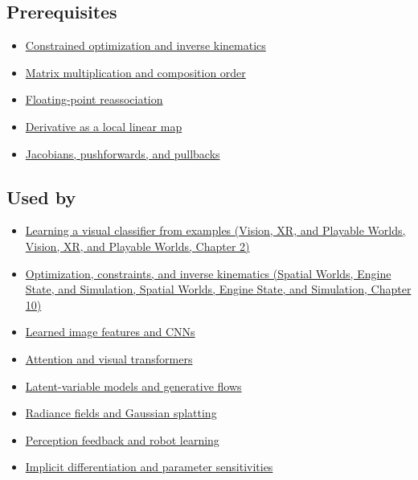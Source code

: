 \subsection{Prerequisites}\label{appendix-40df0855b4a7-prerequisites}

\begin{itemize}
\tightlist
\item
  \hyperref[appendix-29f4bea4c2bb]{Constrained optimization and inverse kinematics}
\item
  \hyperref[appendix-ab31ef447dbf]{Matrix multiplication and composition order}
\item
  \hyperref[appendix-c2ac4a84c283]{Floating-point reassociation}
\item
  \hyperref[appendix-7bc181935c42]{Derivative as a local linear map}
\item
  \hyperref[appendix-d8a7ddb675eb]{Jacobians, pushforwards, and pullbacks}
\end{itemize}

\subsection{Used by}\label{appendix-40df0855b4a7-used-by}

\begin{itemize}
\tightlist
\item
  \href{../07-Vision-XR-and-Playable-Worlds/main.pdf\#nameddest=04-visual-computing-ii-ch031-learning-a-visual-classifier-from-examples}{Learning a visual classifier from examples (Vision, XR, and Playable Worlds, Vision, XR, and Playable Worlds, Chapter 2)}
\item
  \href{../05-Spatial-Worlds-Engine-State-and-Simulation/main.pdf\#nameddest=04-visual-computing-ii-ch029-optimization-constraints-and-inverse-kinematics}{Optimization, constraints, and inverse kinematics (Spatial Worlds, Engine State, and Simulation, Spatial Worlds, Engine State, and Simulation, Chapter 10)}
\item
  \hyperref[appendix-47c51ea026fb]{Learned image features and CNNs}
\item
  \hyperref[appendix-a9d5dfdd164a]{Attention and visual transformers}
\item
  \hyperref[appendix-2c568f05ee34]{Latent-variable models and generative flows}
\item
  \hyperref[appendix-c5b332e400e7]{Radiance fields and Gaussian splatting}
\item
  \hyperref[appendix-b0c42da325f1]{Perception feedback and robot learning}
\item
  \hyperref[appendix-8836553d56fc]{Implicit differentiation and parameter sensitivities}
\end{itemize}

